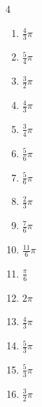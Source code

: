 \begin{multicols}{4}
\begin{enumerate}
  \item $\displaystyle \frac{4}{3}\pi$

  \item $\displaystyle \frac{5}{4}\pi$

  \item $\displaystyle \frac{3}{2}\pi$

  \item $\displaystyle \frac{4}{3}\pi$

  \item $\displaystyle \frac{3}{4}\pi$

  \item $\displaystyle \frac{5}{6}\pi$

  \item $\displaystyle \frac{5}{6}\pi$

  \item $\displaystyle \frac{2}{3}\pi$

  \item $\displaystyle \frac{7}{6}\pi$

  \item $\displaystyle \frac{11}{6}\pi$

  \item $\displaystyle \frac{\pi}{6}$

  \item $\displaystyle 2\pi$

  \item $\displaystyle \frac{4}{3}\pi$

\columnbreak %

  \item $\displaystyle \frac{5}{3}\pi$

  \item $\displaystyle \frac{5}{3}\pi$

  \item $\displaystyle \frac{3}{2}\pi$


\end{enumerate}
\end{multicols}
